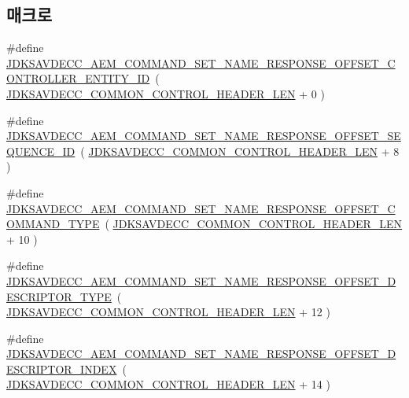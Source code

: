 \subsection*{매크로}
\begin{DoxyCompactItemize}
\item 
\#define \hyperlink{group__command__set__name__response_gadf9404e54a40ec49ab5dfc043228a4d6}{J\+D\+K\+S\+A\+V\+D\+E\+C\+C\+\_\+\+A\+E\+M\+\_\+\+C\+O\+M\+M\+A\+N\+D\+\_\+\+S\+E\+T\+\_\+\+N\+A\+M\+E\+\_\+\+R\+E\+S\+P\+O\+N\+S\+E\+\_\+\+O\+F\+F\+S\+E\+T\+\_\+\+C\+O\+N\+T\+R\+O\+L\+L\+E\+R\+\_\+\+E\+N\+T\+I\+T\+Y\+\_\+\+ID}~( \hyperlink{group__jdksavdecc__avtp__common__control__header_gaae84052886fb1bb42f3bc5f85b741dff}{J\+D\+K\+S\+A\+V\+D\+E\+C\+C\+\_\+\+C\+O\+M\+M\+O\+N\+\_\+\+C\+O\+N\+T\+R\+O\+L\+\_\+\+H\+E\+A\+D\+E\+R\+\_\+\+L\+EN} + 0 )
\item 
\#define \hyperlink{group__command__set__name__response_ga1f01d9c24d5d60ee7d5af99e5256b08f}{J\+D\+K\+S\+A\+V\+D\+E\+C\+C\+\_\+\+A\+E\+M\+\_\+\+C\+O\+M\+M\+A\+N\+D\+\_\+\+S\+E\+T\+\_\+\+N\+A\+M\+E\+\_\+\+R\+E\+S\+P\+O\+N\+S\+E\+\_\+\+O\+F\+F\+S\+E\+T\+\_\+\+S\+E\+Q\+U\+E\+N\+C\+E\+\_\+\+ID}~( \hyperlink{group__jdksavdecc__avtp__common__control__header_gaae84052886fb1bb42f3bc5f85b741dff}{J\+D\+K\+S\+A\+V\+D\+E\+C\+C\+\_\+\+C\+O\+M\+M\+O\+N\+\_\+\+C\+O\+N\+T\+R\+O\+L\+\_\+\+H\+E\+A\+D\+E\+R\+\_\+\+L\+EN} + 8 )
\item 
\#define \hyperlink{group__command__set__name__response_gab707d3a657b273b91d0217d336bd386c}{J\+D\+K\+S\+A\+V\+D\+E\+C\+C\+\_\+\+A\+E\+M\+\_\+\+C\+O\+M\+M\+A\+N\+D\+\_\+\+S\+E\+T\+\_\+\+N\+A\+M\+E\+\_\+\+R\+E\+S\+P\+O\+N\+S\+E\+\_\+\+O\+F\+F\+S\+E\+T\+\_\+\+C\+O\+M\+M\+A\+N\+D\+\_\+\+T\+Y\+PE}~( \hyperlink{group__jdksavdecc__avtp__common__control__header_gaae84052886fb1bb42f3bc5f85b741dff}{J\+D\+K\+S\+A\+V\+D\+E\+C\+C\+\_\+\+C\+O\+M\+M\+O\+N\+\_\+\+C\+O\+N\+T\+R\+O\+L\+\_\+\+H\+E\+A\+D\+E\+R\+\_\+\+L\+EN} + 10 )
\item 
\#define \hyperlink{group__command__set__name__response_ga725174059092bcf14a4e499d147f5df1}{J\+D\+K\+S\+A\+V\+D\+E\+C\+C\+\_\+\+A\+E\+M\+\_\+\+C\+O\+M\+M\+A\+N\+D\+\_\+\+S\+E\+T\+\_\+\+N\+A\+M\+E\+\_\+\+R\+E\+S\+P\+O\+N\+S\+E\+\_\+\+O\+F\+F\+S\+E\+T\+\_\+\+D\+E\+S\+C\+R\+I\+P\+T\+O\+R\+\_\+\+T\+Y\+PE}~( \hyperlink{group__jdksavdecc__avtp__common__control__header_gaae84052886fb1bb42f3bc5f85b741dff}{J\+D\+K\+S\+A\+V\+D\+E\+C\+C\+\_\+\+C\+O\+M\+M\+O\+N\+\_\+\+C\+O\+N\+T\+R\+O\+L\+\_\+\+H\+E\+A\+D\+E\+R\+\_\+\+L\+EN} + 12 )
\item 
\#define \hyperlink{group__command__set__name__response_gae37273b9920a4d507b9ff32c1bef8e78}{J\+D\+K\+S\+A\+V\+D\+E\+C\+C\+\_\+\+A\+E\+M\+\_\+\+C\+O\+M\+M\+A\+N\+D\+\_\+\+S\+E\+T\+\_\+\+N\+A\+M\+E\+\_\+\+R\+E\+S\+P\+O\+N\+S\+E\+\_\+\+O\+F\+F\+S\+E\+T\+\_\+\+D\+E\+S\+C\+R\+I\+P\+T\+O\+R\+\_\+\+I\+N\+D\+EX}~( \hyperlink{group__jdksavdecc__avtp__common__control__header_gaae84052886fb1bb42f3bc5f85b741dff}{J\+D\+K\+S\+A\+V\+D\+E\+C\+C\+\_\+\+C\+O\+M\+M\+O\+N\+\_\+\+C\+O\+N\+T\+R\+O\+L\+\_\+\+H\+E\+A\+D\+E\+R\+\_\+\+L\+EN} + 14 )

\end{DoxyCompactItemize}

